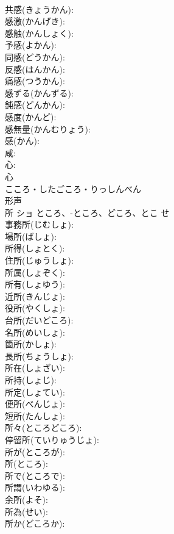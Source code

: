\documentclass[8pt]{extreport}
\begin{document}
\begin{CJK}{UTF8}{min}
\\	共感(きょうかん): 
\\	感激(かんげき): 
\\	感触(かんしょく): 
\\	予感(よかん): 
\\	同感(どうかん): 
\\	反感(はんかん): 
\\	痛感(つうかん): 
\\	感ずる(かんずる): 
\\	鈍感(どんかん): 
\\	感度(かんど): 
\\	感無量(かんむりょう): 
\\	感(かん): 
\\	咸: 
\\	心: 
\\	心	
\\	こころ・したごころ・りっしんべん	
\\	形声 
\\	所	ショ	ところ、-ところ、どころ、とこ	せ	
\\	事務所(じむしょ): 
\\	場所(ばしょ): 
\\	所得(しょとく): 
\\	住所(じゅうしょ): 
\\	所属(しょぞく): 
\\	所有(しょゆう): 
\\	近所(きんじょ): 
\\	役所(やくしょ): 
\\	台所(だいどころ): 
\\	名所(めいしょ): 
\\	箇所(かしょ): 
\\	長所(ちょうしょ): 
\\	所在(しょざい): 
\\	所持(しょじ): 
\\	所定(しょてい): 
\\	便所(べんじょ): 
\\	短所(たんしょ): 
\\	所々(ところどころ): 
\\	停留所(ていりゅうじょ): 
\\	所が(ところが): 
\\	所(ところ): 
\\	所で(ところで): 
\\	所謂(いわゆる): 
\\	余所(よそ): 
\\	所為(せい): 
\\	所か(どころか): 

\end{CJK}
\end{document}
